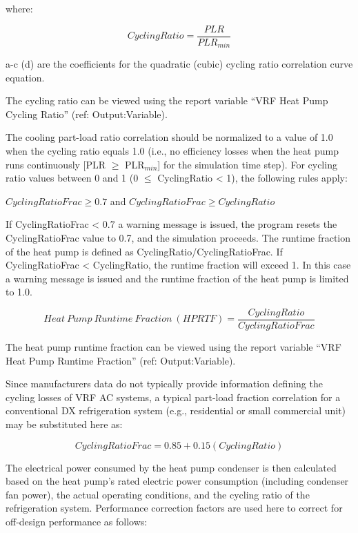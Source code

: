 where:

\begin{equation}
  CyclingRatio = \frac{PLR}{PLR_{min}}
\end{equation}

a-c (d) are the coefficients for the quadratic (cubic) cycling ratio correlation curve equation.

The cycling ratio can be viewed using the report variable ``VRF Heat Pump Cycling Ratio'' (ref: Output:Variable).

The cooling part-load ratio correlation should be normalized to a value of 1.0 when the cycling ratio equals 1.0 (i.e., no efficiency losses when the heat pump runs continuously [PLR \(\geq\) PLR\(_{min}\)] for the simulation time step). For cycling ratio values between 0 and 1 (0 \(\leq\) CyclingRatio < 1), the following rules apply:

\(CyclingRatioFrac \geq 0.7\) and \(CyclingRatioFrac \geq CyclingRatio\)

If CyclingRatioFrac < 0.7 a warning message is issued, the program resets the CyclingRatioFrac value to 0.7, and the simulation proceeds. The runtime fraction of the heat pump is defined as CyclingRatio/CyclingRatioFrac. If CyclingRatioFrac < CyclingRatio, the runtime fraction will exceed 1. In this case a warning message is issued and the runtime fraction of the heat pump is limited to 1.0.

\begin{equation}
  Heat~Pump~Runtime~Fraction~(HPRTF) = \frac{CyclingRatio}{CyclingRatioFrac}
\end{equation}

The heat pump runtime fraction can be viewed using the report variable ``VRF Heat Pump Runtime Fraction'' (ref: Output:Variable).

Since manufacturers data do not typically provide information defining the cycling losses of VRF AC systems, a typical part-load fraction correlation for a conventional DX refrigeration system (e.g., residential or small commercial unit) may be substituted here as:

\begin{equation}
  CyclingRatioFrac = 0.85 + 0.15(CyclingRatio)
\end{equation}

The electrical power consumed by the heat pump condenser is then calculated based on the heat pump's rated electric power consumption (including condenser fan power), the actual operating conditions, and the cycling ratio of the refrigeration system. Performance correction factors are used here to correct for off-design performance as follows:

